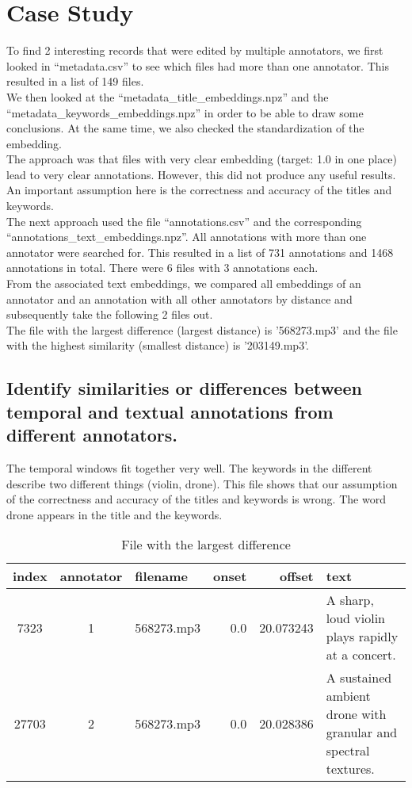 
\section{Case Study}
\label{sec:Case Study}

To find 2 interesting records that were edited by multiple annotators, 
we first looked in ``metadata.csv'' to see which files had more than one annotator. 
This resulted in a list of 149 files. \\
We then looked at the ``metadata\_title\_embeddings.npz'' and the ``metadata\_keywords\_embeddings.npz'' in order 
to be able to draw some conclusions. 
At the same time, we also checked the standardization of the embedding. \\
The approach was that files with very clear embedding (target: 1.0 in one place) lead to very clear annotations. 
However, this did not produce any useful results. \\
An important assumption here is the correctness and accuracy of the titles and keywords. \\
The next approach used the file ``annotations.csv'' and the corresponding ``annotations\_text\_embeddings.npz''. 
All annotations with more than one annotator were searched for. 
This resulted in a list of 731 annotations and 1468 annotations in total. There were 6 files with 3 annotations each. \\
From the associated text embeddings, we compared all embeddings of an annotator and an annotation with all other annotators by distance and 
subsequently take the following 2 files out. \\
The file with the largest difference (largest distance) is '568273.mp3' and the file with the highest similarity (smallest distance) is '203149.mp3'.


\subsection{Identify similarities or differences between temporal and textual annotations from different annotators.}
\label{sec:Case Study:a}

The temporal windows fit together very well. The keywords in the different describe two different things (violin, drone).
This file shows that our assumption of the correctness and accuracy of the titles and keywords is wrong. 
The word drone appears in the title and the keywords.

\begin{table}[h]
  \caption{File with the largest difference}
  \label{tab:largest difference}
  \centering
  \begin{tabular}{cclrrp{6cm}}
    \toprule
    index & annotator & filename & onset & offset & text \\
    \midrule
    7323 & 1 & 568273.mp3 & 0.0 & 20.073243 & A sharp, loud violin plays rapidly at a concert. \\
    27703 & 2 & 568273.mp3 & 0.0 & 20.028386 & A sustained ambient drone with granular and spectral textures. \\
    \bottomrule
  \end{tabular}
\end{table}

